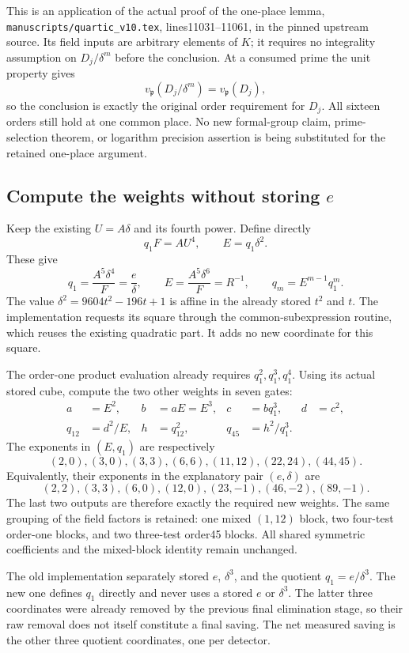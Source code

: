 This is an application of the actual proof of the one-place lemma,
\texttt{manuscripts/quartic\_v10.tex}, lines11031--11061, in the pinned
upstream source. Its field inputs are arbitrary elements of $K$; it
requires no integrality assumption on $D_j/\delta^m$ before the
conclusion. At a consumed prime the unit property gives
\[
 v_{\mathfrak p}(D_j/\delta^m)=v_{\mathfrak p}(D_j),
\]
so the conclusion is exactly the original order requirement for $D_j$.
All sixteen orders still hold at one common place. No new formal-group
claim, prime-selection theorem, or logarithm precision assertion is
being substituted for the retained one-place argument.

\subsection{Compute the weights without storing $e$}

Keep the existing $U=A\delta$ and its fourth power. Define directly
\[
 q_1F=A U^4,\qquad E=q_1\delta^2.
\]
These give
\[
 q_1=\frac{A^5\delta^4}{F}=\frac e\delta,
 \qquad E=\frac{A^5\delta^6}{F}=R^{-1},
 \qquad q_m=E^{m-1}q_1^m.
\]
The value $\delta^2=9604t^2-196t+1$ is affine in the already stored
$t^2$ and $t$. The implementation requests its square through the
common-subexpression routine, which reuses the existing quadratic
part. It adds no new coordinate for this square.

The order-one product evaluation already requires $q_1^2,q_1^3,q_1^4$.
Using its actual stored cube, compute the two other weights in seven gates:
\begin{align*}
 a&=E^2,& b&=aE=E^3,& c&=bq_1^3,& d&=c^2,\\
 q_{12}&=d^2/E,& h&=q_{12}^2,&q_{45}&=h^2/q_1^3.
\end{align*}
The exponents in $(E,q_1)$ are respectively
\[
 (2,0),(3,0),(3,3),(6,6),(11,12),(22,24),(44,45).
\]
Equivalently, their exponents in the explanatory pair $(e,\delta)$ are
\[
 (2,2),(3,3),(6,0),(12,0),(23,-1),(46,-2),(89,-1).
\]
The last two outputs are therefore exactly the required new weights.
The same grouping of the field factors is retained: one mixed $(1,12)$
block, two four-test order-one blocks, and two three-test order45 blocks.
All shared symmetric coefficients and the mixed-block identity remain
unchanged.

The old implementation separately stored $e$, $\delta^3$, and the
quotient $q_1=e/\delta^3$. The new one defines $q_1$ directly and never
uses a stored $e$ or $\delta^3$. The latter three coordinates were
already removed by the previous final elimination stage, so their raw
removal does not itself constitute a final saving. The net measured
saving is the other three quotient coordinates, one per detector.


